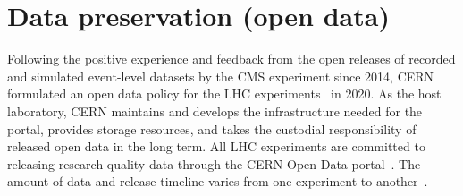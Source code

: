 \documentclass[11pt]{article}
\begin{document}


\section{Data preservation (open data)}
\label{data-preservation}


Following the positive experience and feedback from the open releases of recorded and simulated event-level datasets by the \gls{CMS} experiment since 2014, \gls{CERN} formulated an open data policy for the \gls{LHC} experiments~\cite{cern-data-policy} in 2020. As the host laboratory, \gls{CERN} maintains and develops the infrastructure needed for the portal, provides storage resources, and takes the custodial responsibility of released open data in the long term. All \gls{LHC} experiments are committed to releasing research-quality data through the \gls{CERN} Open Data portal~\cite{CODP}. The amount of data and release timeline varies from one experiment to another~\cite{cern-data-policy,cern-open-data-privacy-policy,cms-open-data-policy,atlas-open-data-policy,lhcb-open-data-policy,alice-open-data-policy}. 
\end{document}
